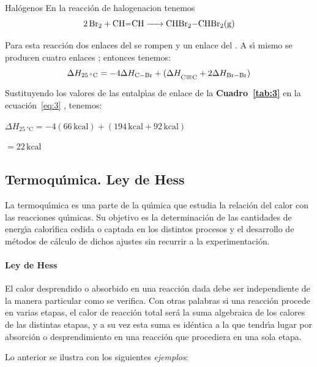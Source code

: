 \begin{ejemplo}{Hal\'ogenos}
En la reacci\'on de \gls{halogenacion} 
tenemos
\begin{equation}
\ce{2Br2 + CH=CH ->  CHBr2-CHBr2(g)}
\end{equation}

Para esta reacci\'on dos enlaces  del  se rompen y un enlace  del . A s\'{\i} mismo se producen cuatro enlaces ; entonces tenemos:
\begin{equation}
\label{eq:3}
\Delta H_{ \SI{25}{\celsius} } = - 4\Delta H_{\ce{C-Br}} 
+ (\Delta H_{\ce{C\bond{#}C} } + 2\Delta H_{\ce{Br-Br}})
\end{equation}
Sustituyendo los valores de las entalp\'{\i}as de enlace de la \textbf{Cuadro~\ref{tab:3}} en la e\-cua\-ci\'on~\ref{eq:3} , tenemos:

\hskip 1in   $\Delta H_{ \SI{25}{\celsius} } = -4(66 \,\textrm{kcal}) + (194 \,\textrm{kcal} + 92 \,\textrm{kcal})$

\hskip 1.59in $= 22 \,\textrm{kcal}$
\end{ejemplo}

\subsection{Termoqu\'{\i}mica. Ley de Hess}

La termoqu\'{\i}mica es una parte de la qu\'{\i}mica que estudia la relaci\'on del calor con las reacciones qu\'{\i}micas. Su objetivo es
la determinaci\'on de las cantidades de energ\'{\i}a calor\'{\i}fica cedida o captada en los distintos procesos y el desarrollo de
m\'etodos de c\'alculo de dichos ajustes sin recurrir a la experimentaci\'on.

\paragraph{Ley de Hess} El calor desprendido o absorbido en una reacci\'on dada debe ser independiente de la manera particular como se verifica. Con otras palabras si una reacci\'on procede en varias etapas, el calor de reacci\'on total ser\'a la suma algebraica de los calores de las distintas etapas, y a su vez esta suma es id\'entica a la que tendr\'{\i}a lugar por absorci\'on o desprendimiento en una reacci\'on que procediera en una sola etapa.

Lo anterior se ilustra con los siguientes \textit{ejemplos}:

